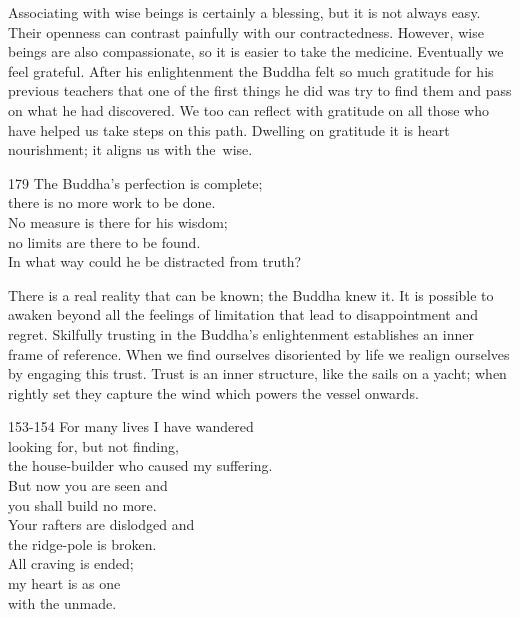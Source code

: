 \begin{dhpRefl}

Associating with wise beings is certainly a blessing, but it is not
always easy. Their openness can contrast painfully with our
contractedness. However, wise beings are also compassionate, so it is
easier to take the medicine. Eventually we feel grateful. After his
enlightenment the Buddha felt so much gratitude for his previous
teachers that one of the first things he did was try to find them and
pass on what he had discovered. We too can reflect with gratitude on
all those who have helped us take steps on this path. Dwelling on
gratitude it is heart nourishment; it aligns us with the~wise.

\end{dhpRefl}


\begin{dhpVerse}{179}
\label{dhp-179}
The Buddha's perfection is complete;\\
there is no more work to be done.\\
No measure is there for his wisdom;\\
no limits are there to be found.\\
In what way could he be distracted from truth?
\end{dhpVerse}

\begin{dhpRefl}

There is a real reality that can be known; the Buddha knew it. It is
possible to awaken beyond all the feelings of limitation that lead to
disappointment and regret. Skilfully trusting in the Buddha's
enlightenment establishes an inner frame of reference. When we find
ourselves disoriented by life we realign ourselves by engaging this
trust. Trust is an inner structure, like the sails on a yacht; when
rightly set they capture the wind which powers the vessel onwards.

\end{dhpRefl}


\begin{dhpVerse}{153-154}
\label{dhp-153}\label{dhp-154}
For many lives I have wandered\\
looking for, but not finding,\\
the house-builder who caused my suffering.\\
But now you are seen and\\
you shall build no more.\\
Your rafters are dislodged and\\
the ridge-pole is broken.\\
All craving is ended;\\
my heart is as one\\
with the unmade.
\end{dhpVerse}

